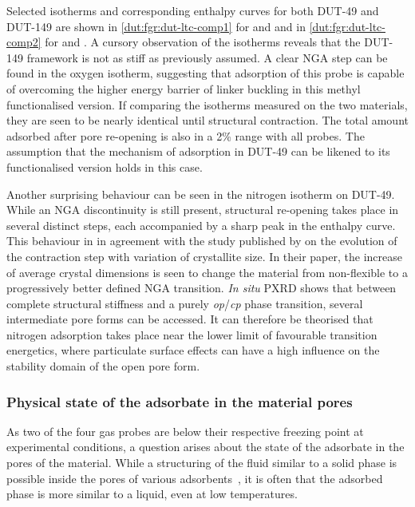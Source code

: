Selected isotherms and corresponding enthalpy curves for both 
DUT-49 and DUT-149 are shown in \autoref{dut:fgr:dut-ltc-comp1}
for  and  and in \autoref{dut:fgr:dut-ltc-comp2}
for  and . A cursory observation of the isotherms
reveals that the DUT-149 framework is not as stiff as 
previously assumed. A clear NGA step can be found in the 
oxygen isotherm, suggesting that adsorption of this probe is capable 
of overcoming the higher energy barrier of linker buckling in 
this methyl functionalised version.
If comparing the isotherms measured on the two materials, they
are seen to be nearly identical until structural contraction.
The total amount adsorbed after pore re-opening is also in a 
2\% range with all probes. The assumption that the mechanism 
of adsorption in DUT-49 can be likened to its functionalised
version holds in this case.

Another surprising behaviour
can be seen in the nitrogen isotherm on DUT-49. While an NGA
discontinuity is still present, structural re-opening takes
place in several distinct steps, each accompanied by a sharp 
peak in the enthalpy curve. This behaviour in in
agreement with the study published by 
 \citet{krauseEffectCrystalliteSize2018}
on the evolution of the contraction step with variation of 
crystallite size. In their paper, the increase of average 
crystal dimensions is seen to change the material from non-flexible 
to a progressively better defined NGA transition. \textit{In situ} 
PXRD shows that between complete structural stiffness and a 
purely \textit{op}/\textit{cp} phase transition, several intermediate 
pore forms can be accessed. It can therefore be theorised that 
nitrogen adsorption takes place near the lower limit of 
favourable transition energetics, where particulate surface 
effects can have a high influence on the stability domain of
the open pore form.

\subsubsection{Physical state of the adsorbate in the material pores}

As two of the four gas probes are below their respective freezing point
at experimental conditions, a question arises about the state of
the adsorbate in the pores of the material. While a structuring of
the fluid similar to a solid phase is possible inside the 
pores of various adsorbents~\cite{llewellynAdsorptionMFItypeZeolites1993a},
it is often that the adsorbed phase is more similar to a liquid,
even at low temperatures.

